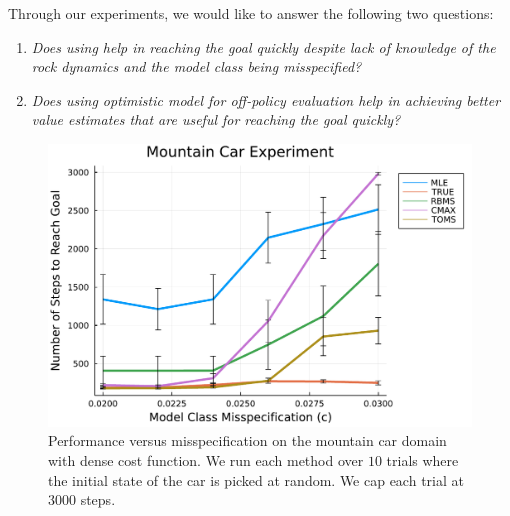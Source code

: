 Through our experiments, we would like to answer the following two
questions:
\begin{enumerate}
\item \textit{Does using \taml{} help in reaching the goal quickly
    despite lack of knowledge of the rock dynamics and the model class
    being misspecified?}
\item \textit{Does using optimistic model for off-policy evaluation
    help in achieving better value estimates that are useful for
    reaching the goal quickly?}
\end{enumerate}

\begin{figure}[t]
  \centering
\includegraphics[width=0.6\linewidth]{figures/taml/mountain_car_online_model_search_all_dense.pdf} 
  \caption{Performance versus misspecification on the mountain car
    domain with dense cost function. We run each method over $10$ trials where the initial
    state of the car is picked at random. We cap each trial at $3000$
    steps.}
  \label{fig:performance}
\end{figure}

